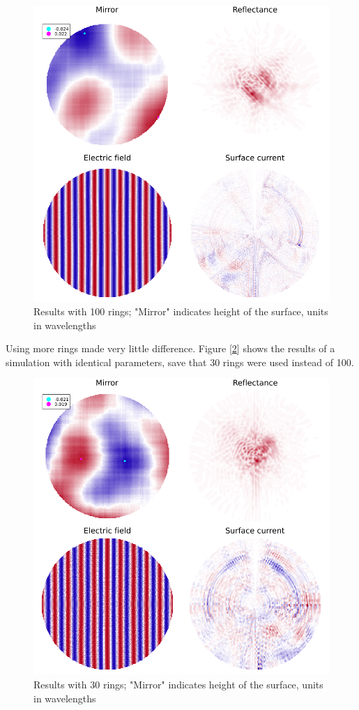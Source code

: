 \documentclass[etd,twoside,senior,noacknowledgments]{BYUPhys}
\begin{document}
\begin{figure}
  \centerline{\includegraphics[width=\textwidth]{100-ring-results}}
  \caption[Results with 100 rings]{\label{fig:100_rings}
    Results with 100 rings; "Mirror" indicates height of the surface, units in wavelengths}
\end{figure}

Using more rings made very little difference. Figure [\ref{fig:30_rings}] shows the results of a simulation with identical parameters, save that 30 rings were used instead of 100.

\begin{figure}
  \centerline{\includegraphics[width=\textwidth]{30-ring-results}}
  \caption[Results with 30 rings]{\label{fig:30_rings}
    Results with 30 rings; "Mirror" indicates height of the surface, units in wavelengths}
\end{figure}
\end{document}
